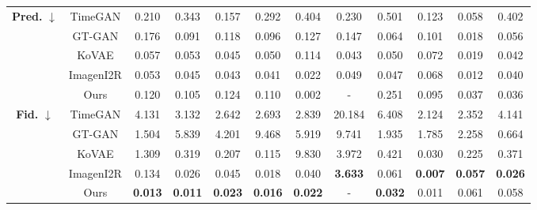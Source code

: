 \documentclass{article}
\theoremstyle{plain}
\theoremstyle{definition}
\theoremstyle{remark}
\begin{document}
\begin{table}[!t]
{\begin{tabular}{cc|cccccccccc}
    \multirow{5}{*}{\textbf{Pred.} $\downarrow$}
      & TimeGAN
         & 0.210
         & 0.343
         & 0.157
         & 0.292
         & 0.404
         & 0.230
         & 0.501
         & 0.123
         & 0.058
         & 0.402 \\
      & GT-GAN
         & 0.176
         & 0.091
         & 0.118
         & 0.096
         & 0.127
         & 0.147
         & 0.064
         & 0.101
         & 0.018
         & 0.056 \\
      & KoVAE
         & 0.057
         & 0.053
         & 0.045
         & 0.050
         & 0.114
         & 0.043
         & 0.050
         & 0.072
         & 0.019
         & 0.042 \\
      & ImagenI2R
         & 0.053
         & 0.045
         & 0.043
         & 0.041
         & 0.022
         & 0.049
         & 0.047
         & 0.068
         & 0.012
         & 0.040 \\
    & Ours
       & 0.120 & 0.105 & 0.124 & 0.110 & 0.002 & - & 0.251 & 0.095 & 0.037 & 0.036 \\
    \midrule

    \multirow{5}{*}{\textbf{Fid.} $\downarrow$}
      & TimeGAN
         & 4.131
         & 3.132
         & 2.642
         & 2.693
         & 2.839
         & 20.184
         & 6.408
         & 2.124
         & 2.352
         & 4.141 \\
      & GT-GAN
         & 1.504
         & 5.839
         & 4.201
         & 9.468
         & 5.919
         & 9.741
         & 1.935
         & 1.785
         & 2.258
         & 0.664 \\
      & KoVAE
         & 1.309
         & 0.319
         & 0.207
         & 0.115
         & 9.830
         & 3.972
         & 0.421
         & 0.030
         & 0.225
         & 0.371 \\
      & ImagenI2R
         & 0.134
         & 0.026
         & 0.045
         & 0.018
         & 0.040
         & \textbf{3.633}
         & 0.061
         & \textbf{0.007}
         & \textbf{0.057}
         & \textbf{0.026} \\
    & Ours
       & \textbf{0.013} & \textbf{0.011} & \textbf{0.023} & \textbf{0.016} & \textbf{0.022} & - & \textbf{0.032} & 0.011 & 0.061 & 0.058 \\
    \midrule


\end{tabular}}
\end{table}
\end{document}

